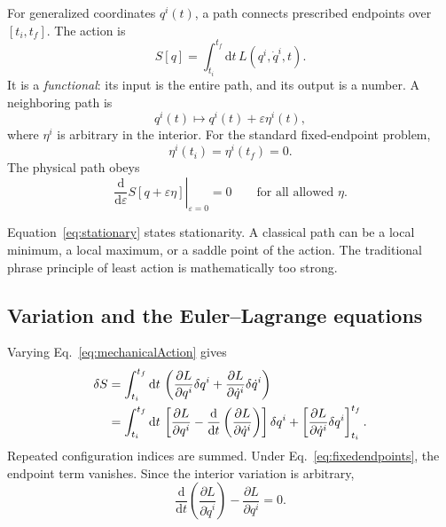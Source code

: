 \documentclass[11pt]{article}
\newcommand{\dd}{\mathrm{d}}
\begin{document}
For generalized coordinates \(q^i(t)\), a path connects prescribed endpoints
over \([t_i,t_f]\). The action is
\begin{equation}
  S[q]=\int_{t_i}^{t_f}\dd t\,L(q^i,\dot q^i,t).
  \label{eq:mechanicalAction}
\end{equation}
It is a \emph{functional}: its input is the entire path, and its output is a
number. A neighboring path is
\begin{equation}
  q^i(t)\longmapsto q^i(t)+\varepsilon\eta^i(t),
\end{equation}
where \(\eta^i\) is arbitrary in the interior. For the standard fixed-endpoint
problem,
\begin{equation}
  \eta^i(t_i)=\eta^i(t_f)=0.
  \label{eq:fixedendpoints}
\end{equation}
The physical path obeys
\begin{equation}
  \left.\frac{\dd}{\dd\varepsilon}
  S[q+\varepsilon\eta]\right|_{\varepsilon=0}=0
  \qquad\text{for all allowed }\eta.
  \label{eq:stationary}
\end{equation}

\begin{warningbox}
Equation~\eqref{eq:stationary} states stationarity. A classical path can be a
local minimum, a local maximum, or a saddle point of the action. The
traditional phrase principle of least action is mathematically too strong.
\end{warningbox}

\subsection{Variation and the Euler--Lagrange equations}

Varying Eq.~\eqref{eq:mechanicalAction} gives
\begin{align}
  \delta S
  &=\int_{t_i}^{t_f}\dd t\,
  \left(
    \frac{\partial L}{\partial q^i}\delta q^i
    +\frac{\partial L}{\partial\dot q^i}\delta\dot q^i
  \right)\notag\\
  &=\int_{t_i}^{t_f}\dd t\,
  \left[
    \frac{\partial L}{\partial q^i}
    -\frac{\dd}{\dd t}
      \left(\frac{\partial L}{\partial\dot q^i}\right)
  \right]\delta q^i
  +\left[
    \frac{\partial L}{\partial\dot q^i}\delta q^i
  \right]_{t_i}^{t_f}.
  \label{eq:variationMechanics}
\end{align}
Repeated configuration indices are summed. Under
Eq.~\eqref{eq:fixedendpoints}, the endpoint term vanishes. Since the interior
variation is arbitrary,
\begin{equation}
  \boxed{
  \frac{\dd}{\dd t}\left(\frac{\partial L}{\partial\dot q^i}\right)
  -\frac{\partial L}{\partial q^i}=0.}
  \label{eq:ELmechanics}
\end{equation}
\end{document}
